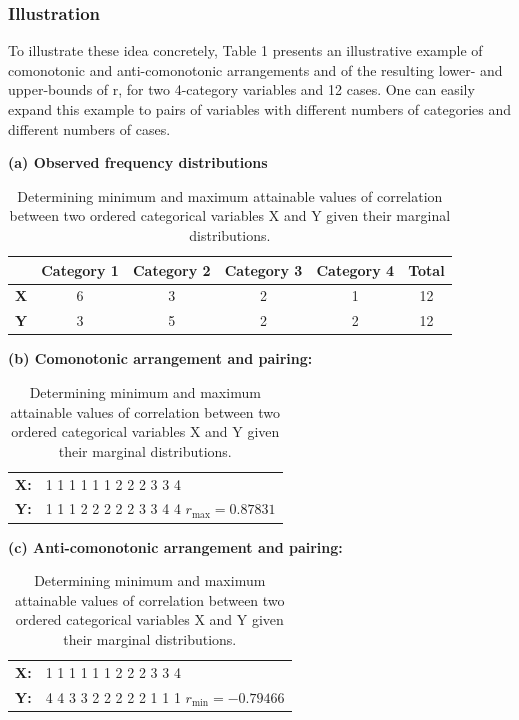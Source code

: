 \documentclass[
  12pt,
]{article}
\theoremstyle{plain}
\theoremstyle{definition}
\theoremstyle{remark}
\begin{document}
\subsubsection{Illustration}\label{illustration}

To illustrate these idea concretely, Table 1 presents an illustrative
example of comonotonic and anti-comonotonic arrangements and of the
resulting lower- and upper-bounds of r, for two 4-category variables and
12 cases. One can easily expand this example to pairs of variables with
different numbers of categories and different numbers of cases.

\begin{table}[H]
\centering
\caption{Determining minimum and maximum attainable values of correlation between two ordered categorical variables X and Y given their marginal distributions.}
\label{tab:correlation_bounds}

\vspace{0.5em}

\textbf{(a) Observed frequency distributions}

\vspace{0.3em}

\begin{tabular}{c|cccc|c}
\hline
 & \textbf{Category 1} & \textbf{Category 2} & \textbf{Category 3} & \textbf{Category 4} & \textbf{Total} \\
\hline
\textbf{X} & 6 & 3 & 2 & 1 & 12 \\
\textbf{Y} & 3 & 5 & 2 & 2 & 12 \\
\hline
\end{tabular}

\vspace{0.5em}

\textbf{(b) Comonotonic arrangement and pairing:}

\vspace{0.3em}

\begin{tabular}{ll}
\textbf{X:} & 1 1 1 1 1 1 2 2 2 3 3 4 \\
\textbf{Y:} & 1 1 1 2 2 2 2 2 3 3 4 4 \quad $r_{\max} = 0.87831$
\end{tabular}

\vspace{0.5em}

\textbf{(c) Anti-comonotonic arrangement and pairing:}

\vspace{0.3em}

\begin{tabular}{ll}
\textbf{X:} & 1 1 1 1 1 1 2 2 2 3 3 4 \\
\textbf{Y:} & 4 4 3 3 2 2 2 2 2 1 1 1 \quad $r_{\min} = -0.79466$
\end{tabular}

\end{table}
\end{document}
